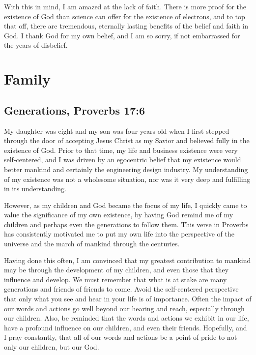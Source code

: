 \documentclass[12pt]{memoir}
\begin{document}
With this in mind, I am amazed at the lack of faith. There is more
proof for the existence of God than science can offer for the existence
of electrons, and to top that off, there are tremendous, eternally
lasting benefits of the belief and faith in God. I thank God for my
own belief, and I am so sorry, if not embarrassed for the years of
disbelief.

\section{Family}

\subsection[Generations]{Generations, Proverbs 17:6}


My daughter was eight and my son was four years old when I first stepped
through the door of accepting Jesus Christ as my Savior and believed
fully in the existence of God. Prior to that time, my life and business
existence were very self-centered, and I was driven by an egocentric
belief that my existence would better mankind and certainly the engineering
design industry. My understanding of my existence was not a wholesome
situation, nor was it very deep and fulfilling in its understanding.

However, as my children and God became the focus of my life, I quickly
came to value the significance of my own existence, by having God
remind me of my children and perhaps even the generations to follow
them. This verse in Proverbs has consistently motivated me to put
my own life into the perspective of the universe and the march
of mankind through the centuries.

Having done this often, I am convinced that my greatest contribution
to mankind may be through the development of my children, and even
those that they influence and develop. We must remember that
what is at stake are many generations and friends of friends to come.
Avoid the self-centered perspective that only what you see and hear
in your life is of importance. Often the impact of our words and actions
go well beyond our hearing and reach, especially through our children.
Also, be reminded that the words and actions we exhibit in our life,
have a profound influence on our children, and even their friends.
Hopefully, and I pray constantly, that all of our words and actions
be a point of pride to not only our children, but our God.
\end{document}
